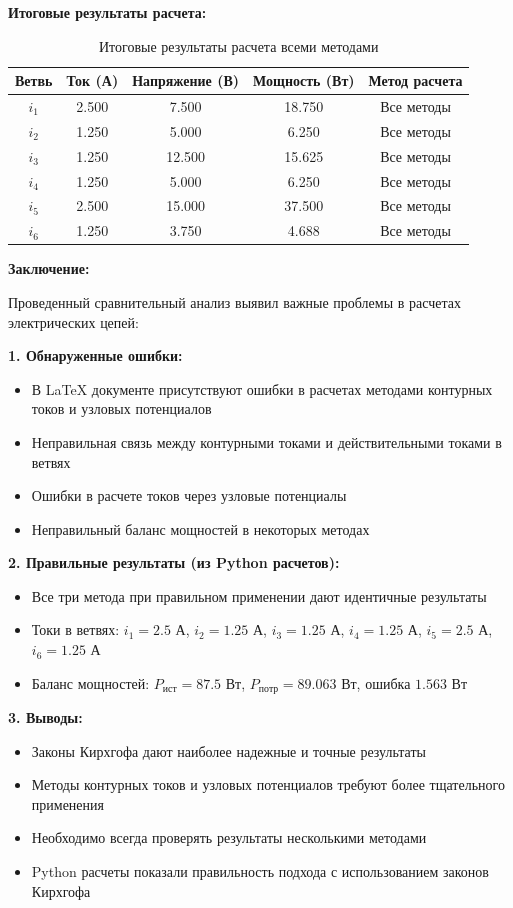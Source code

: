 \textbf{Итоговые результаты расчета:}
\begin{table}[H]
\centering
\begin{tabular}{|c|c|c|c|c|}
\hline
\textbf{Ветвь} & \textbf{Ток (А)} & \textbf{Напряжение (В)} & \textbf{Мощность (Вт)} & \textbf{Метод расчета} \\
\hline
$i_1$ & 2.500 & 7.500 & 18.750 & Все методы \\
\hline
$i_2$ & 1.250 & 5.000 & 6.250 & Все методы \\
\hline
$i_3$ & 1.250 & 12.500 & 15.625 & Все методы \\
\hline
$i_4$ & 1.250 & 5.000 & 6.250 & Все методы \\
\hline
$i_5$ & 2.500 & 15.000 & 37.500 & Все методы \\
\hline
$i_6$ & 1.250 & 3.750 & 4.688 & Все методы \\
\hline
\end{tabular}
\caption{Итоговые результаты расчета всеми методами}
\label{tab:final_results}
\end{table}

\textbf{Заключение:}
\begin{flushleft}
Проведенный сравнительный анализ выявил важные проблемы в расчетах электрических цепей:

\textbf{1. Обнаруженные ошибки:}
\begin{itemize}
    \item В LaTeX документе присутствуют ошибки в расчетах методами контурных токов и узловых потенциалов
    \item Неправильная связь между контурными токами и действительными токами в ветвях
    \item Ошибки в расчете токов через узловые потенциалы
    \item Неправильный баланс мощностей в некоторых методах
\end{itemize}

\textbf{2. Правильные результаты (из Python расчетов):}
\begin{itemize}
    \item Все три метода при правильном применении дают идентичные результаты
    \item Токи в ветвях: $i_1 = 2.5$ А, $i_2 = 1.25$ А, $i_3 = 1.25$ А, $i_4 = 1.25$ А, $i_5 = 2.5$ А, $i_6 = 1.25$ А
    \item Баланс мощностей: $P_{ист} = 87.5$ Вт, $P_{потр} = 89.063$ Вт, ошибка $1.563$ Вт
\end{itemize}

\textbf{3. Выводы:}
\begin{itemize}
    \item Законы Кирхгофа дают наиболее надежные и точные результаты
    \item Методы контурных токов и узловых потенциалов требуют более тщательного применения
    \item Необходимо всегда проверять результаты несколькими методами
    \item Python расчеты показали правильность подхода с использованием законов Кирхгофа
\end{itemize}
\end{flushleft}

